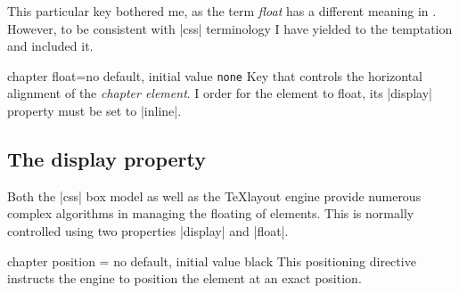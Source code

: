 This particular key bothered me, as the term \emph{float} has a different meaning in \latexe. However, to
be consistent with |css| terminology I have yielded to the temptation and included it.

\begin{docKey}[]{chapter float}{=}{no default, initial value \texttt{none}}
Key that controls the horizontal alignment of the \emph{chapter element}. I order for the
element to float, its |display| property must be set to |inline|.
\end{docKey}



\subsection{The display property}

Both the |css| box model as well as the \TeX layout engine provide numerous complex algorithms in managing the floating of elements. This is normally controlled using two properties |display| and |float|.


\makeatletter

\begin{docKey}[phd]{chapter position}{ = }{no default, initial value black}
This positioning directive instructs the engine to position the element at an exact position.
\end{docKey}



\dotfill{}
\makeatother

